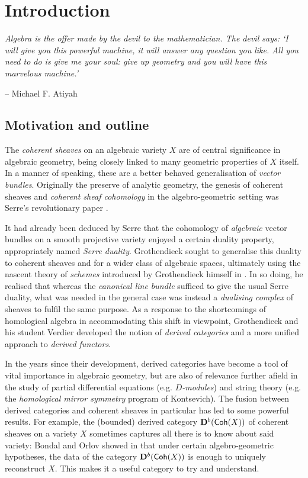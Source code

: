 \chapter{Introduction}
{
  \setlength{\epigraphwidth}{0.5 \textwidth}
  \epigraph{
    \itshape
    Algebra is the offer made by the devil to the mathematician.
    The devil says: `I will give you this powerful machine, it will
    answer any question you like.
    All you need to do is give me your soul: give up geometry and you
    will have this marvelous machine.'
  }{-- Michael F. Atiyah \cite{atiyah_algebra_quote}}
}

\section{Motivation and outline}

The \emph{coherent sheaves} on an algebraic variety $X$ are of
central significance in algebraic geometry, being closely linked to
many geometric properties of $X$ itself.
In a manner of speaking, these are a better behaved generalisation of
\emph{vector bundles}.
Originally the preserve of analytic geometry, the genesis of coherent
sheaves and \emph{coherent sheaf cohomology} in the algebro-geometric
setting was Serre's revolutionary paper \cite{fac}.

It had already been deduced by Serre that the cohomology of
\emph{algebraic} vector bundles on a smooth projective variety
enjoyed a certain duality property, appropriately named \emph{Serre duality}.
Grothendieck sought to generalise this duality to coherent sheaves
and for a wider class of algebraic spaces, ultimately using the
nascent theory of \emph{schemes} introduced by Grothendieck himself
in \cite{ega1}.
In so doing, he realised that whereas the \emph{canonical line
bundle} sufficed to give the usual Serre duality, what was needed in
the general case was instead a \emph{dualising complex} of sheaves to
fulfil the same purpose.
As a response to the shortcomings of homological algebra in
accommodating this shift in viewpoint, Grothendieck and his student
Verdier developed the notion of \emph{derived categories} and a more
unified approach to \emph{derived functors}.

In the years since their development, derived categories have become
a tool of vital importance in algebraic geometry, but are also of
relevance further afield in the study of partial differential
equations (e.g. \emph{$D$-modules}) and string theory (e.g. the
\emph{homological mirror symmetry} program of Kontsevich).
The fusion between derived categories and coherent sheaves in
particular has led to some powerful results.
For example, the (bounded) derived category $\dercat[b]{\Coh(X)}$ of
coherent sheaves on a variety $X$ sometimes captures all there is to
know about said variety:
Bondal and Orlov showed in \cite{bondal_orlov} that under certain
algebro-geometric hypotheses, the data of the category
$\dercat[b]{\Coh(X)}$ is enough to uniquely reconstruct $X$.
This makes it a useful category to try and understand.

